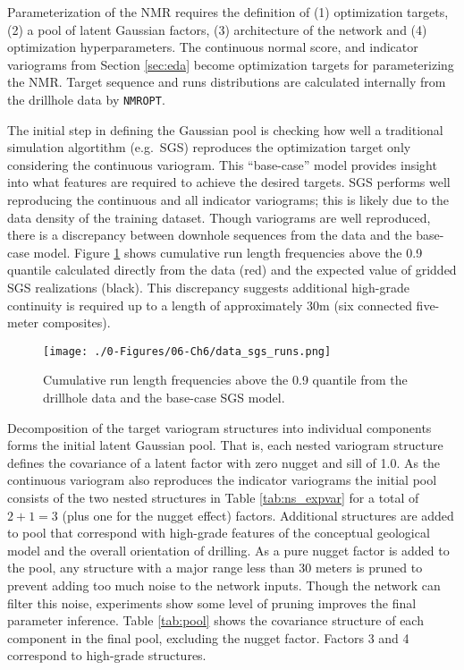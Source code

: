 Parameterization of the \gls{NMR} requires the definition of (1) optimization targets, (2) a pool of latent Gaussian factors, (3) architecture of the network and (4) optimization hyperparameters. The continuous normal score, and indicator variograms from Section \ref{sec:eda} become optimization targets for parameterizing the \gls{NMR}. Target sequence and runs distributions are calculated internally from the drillhole data by \texttt{NMROPT}.

The initial step in defining the Gaussian pool is checking how well a traditional simulation algortithm (e.g.\ \gls{SGS}) reproduces the optimization target only considering the continuous variogram. This ``base-case'' model provides insight into what features are required to achieve the desired targets. \Gls{SGS} performs well reproducing the continuous and all indicator variograms; this is likely due to the data density of the training dataset. Though variograms are well reproduced, there is a discrepancy between downhole sequences from the data and the base-case model. Figure \ref{fig:data_sgs_runs} shows cumulative run length frequencies above the 0.9 quantile calculated directly from the data (red) and the expected value of gridded \gls{SGS} realizations (black). This discrepancy suggests additional high-grade continuity is required up to a length of approximately 30m (six connected five-meter composites).

\begin{figure}[htb!]
    \centering
    \texttt{[image: ./0-Figures/06-Ch6/data\_sgs\_runs.png]}
    \caption{Cumulative run length frequencies above the 0.9 quantile from the drillhole data and the base-case \gls{SGS} model.}
    \label{fig:data_sgs_runs}
\end{figure}

Decomposition of the target variogram structures into individual components forms the initial latent Gaussian pool. That is, each nested variogram structure defines the covariance of a latent factor with zero nugget and sill of 1.0. As the continuous variogram also reproduces the indicator variograms the initial pool consists of the two nested structures in Table \ref{tab:ns_expvar} for a total of $2 + 1 = 3$ (plus one for the nugget effect) factors. Additional structures are added to pool that correspond with high-grade features of the conceptual geological model and the overall orientation of drilling. As a pure nugget factor is added to the pool, any structure with a major range less than 30 meters is pruned to prevent adding too much noise to the network inputs. Though the network can filter this noise, experiments show some level of pruning improves the final parameter inference. Table \ref{tab:pool} shows the covariance structure of each component in the final pool, excluding the nugget factor. Factors 3 and 4 correspond to high-grade structures.


